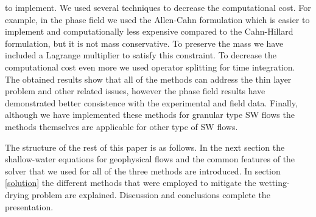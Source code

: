 \documentclass[letterpaper,10pt]{article}
\begin{document}
to implement. We used several techniques to decrease the computational cost. For example, in the phase field we used the Allen-Cahn formulation which is easier to implement and computationally less 
expensive compared to the Cahn-Hillard formulation, but it is not mass conservative. To preserve the mass we have included a Lagrange multiplier \cite{Kim2014,Yang2006} to satisfy this constraint. 
To decrease the computational cost even more we used operator splitting for time integration. The obtained results show that all of the methods can address the thin layer problem and other 
related issues, however the phase field results have demonstrated better consistence with the experimental and field data. 
Finally, although we have implemented these methods for granular type SW flows the methods themselves are applicable for other type of SW flows.  

The structure of the rest of this paper is as follows. In the next section the shallow-water equations for geophysical flows and 
the common features of the solver that we used for all of the three methods are 
introduced. In section \ref{solution} the different methods that were employed to mitigate the wetting-drying problem are explained. 
Discussion and conclusions complete the presentation.
\end{document}
